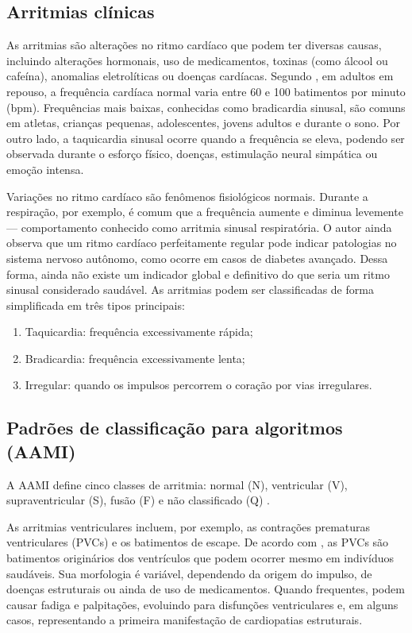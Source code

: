 \subsection{Arritmias clínicas}

As arritmias são alterações no ritmo cardíaco que podem ter diversas causas, incluindo alterações hormonais, uso de medicamentos, toxinas (como álcool ou cafeína), anomalias eletrolíticas ou doenças cardíacas.
Segundo , em adultos em repouso, a frequência cardíaca normal varia entre 60 e 100 batimentos por minuto (bpm). Frequências mais baixas, conhecidas como bradicardia sinusal, são comuns em atletas, crianças pequenas, adolescentes, jovens adultos e durante o sono. Por outro lado, a taquicardia sinusal ocorre quando a frequência se eleva, podendo ser observada durante o esforço físico, doenças, estimulação neural simpática ou emoção intensa.

Variações no ritmo cardíaco são fenômenos fisiológicos normais. Durante a respiração, por exemplo, é comum que a frequência aumente e diminua levemente — comportamento conhecido como arritmia sinusal respiratória. O autor ainda observa que um ritmo cardíaco perfeitamente regular pode indicar patologias no sistema nervoso autônomo, como ocorre em casos de diabetes avançado. Dessa forma, ainda não existe um indicador global e definitivo do que seria um ritmo sinusal considerado saudável.
As arritmias podem ser classificadas de forma simplificada em três tipos principais:

\begin{enumerate}
    \item Taquicardia: frequência excessivamente rápida;
    \item Bradicardia: frequência excessivamente lenta;
    \item Irregular: quando os impulsos percorrem o coração por vias irregulares.
\end{enumerate}

\subsection{Padrões de classificação para algoritmos (AAMI)}

A AAMI define cinco classes de arritmia: normal (N), ventricular (V), supraventricular (S), fusão (F) e não classificado (Q) \cite{silva2025,saadatnejad2020}.

As arritmias ventriculares incluem, por exemplo, as contrações prematuras ventriculares (PVCs) e os batimentos de escape. De acordo com , as PVCs são batimentos originários dos ventrículos que podem ocorrer mesmo em indivíduos saudáveis. Sua morfologia é variável, dependendo da origem do impulso, de doenças estruturais ou ainda de uso de medicamentos. Quando frequentes, podem causar fadiga e palpitações, evoluindo para disfunções ventriculares e, em alguns casos, representando a primeira manifestação de cardiopatias estruturais.

